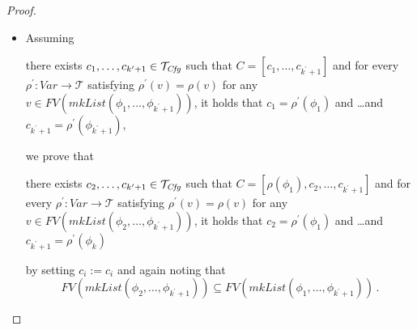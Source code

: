 \begin{proof}
\begin{itemize}
\begin{itemize}
        \item Assuming
        \begin{proofenv}
        there exists $c_1, \ldots, c_{k^\prime + 1} \in \mathcal{T}_{\mathit{Cfg}}$ such that $C = [c_1, \ldots, c_{k^\prime + 1}]$
        and for every $\rho^\prime : \mathit{Var} \to \mathcal{T}$ satisfying
        $\rho^\prime(v) = \rho(v)$ for any
        $v \in \mathit{FV}(\mathit{mkList}(\phi_1, \ldots, \phi_{k^\prime + 1}))$,
        it holds that
        $c_1 = \rho^\prime(\phi_1)$ and \ldots and $c_{k^\prime + 1} = \rho^\prime(\phi_{k^\prime + 1})$,
        \end{proofenv}
        we prove that
        \begin{proofenv}
        there exists $c_2, \ldots, c_{k^\prime + 1} \in \mathcal{T}_{\mathit{Cfg}}$ such that
        $C = [\rho(\phi_1), c_2, \ldots, c_{k^\prime+1}]$
        and for every $\rho^\prime : \mathit{Var} \to \mathcal{T}$ satisfying
        $\rho^\prime(v) = \rho(v)$ for any
        $v \in \mathit{FV}(\mathit{mkList}(\phi_2, \ldots, \phi_{k^\prime+1}))$,
        it holds that
        $c_2 = \rho^\prime(\phi_1)$ and \ldots and $c_{k^\prime+1} = \rho^\prime(\phi_k)$
        \end{proofenv}
        by setting $c_i := c_i$
        and again noting that
        \begin{equation*}
            \mathit{FV}(\mathit{mkList}(\phi_2,\ldots,\phi_{k^\prime+1})) \subseteq \mathit{FV}(\mathit{mkList}(\phi_1,\ldots,\phi_{k^\prime+1})) \, .
        \end{equation*}
    \end{itemize}
\end{itemize}
\end{proof}

